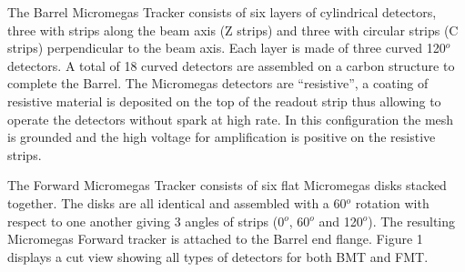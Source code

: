 The Barrel Micromegas Tracker consists of six layers of cylindrical detectors, three with strips along the beam axis (Z strips) and three with circular strips (C strips) perpendicular to the beam axis. Each layer is made of three curved 120$^o$ detectors. A total of 18 curved detectors are assembled on a carbon structure to complete the Barrel. The Micromegas detectors are ``resistive'', a coating of resistive material is deposited on the top of the readout strip thus allowing to operate the detectors without spark at high rate. In this configuration the mesh is grounded and the high voltage for amplification is positive on the resistive strips.

The Forward Micromegas Tracker consists of six flat Micromegas disks stacked together. The disks are all identical and assembled with a 60$^o$ rotation with respect to one another giving 3 angles of strips (0$^o$, 60$^o$ and 120$^o$). The resulting Micromegas Forward tracker is attached to the Barrel end flange. Figure 1 displays a cut view showing all types of detectors for both BMT and FMT.

